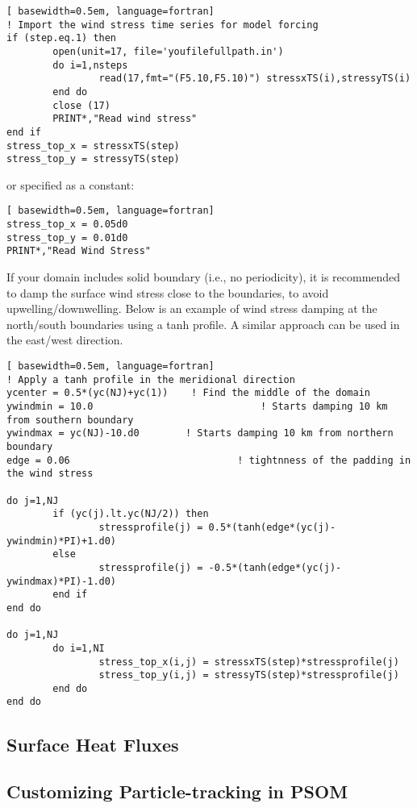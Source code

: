 \documentclass[12pt,letterpaper,titlepage]{article}
\begin{document}
\begin{lstlisting}[	basewidth=0.5em, language=fortran]
! Import the wind stress time series for model forcing
if (step.eq.1) then
		open(unit=17, file='youfilefullpath.in')
		do i=1,nsteps
				read(17,fmt="(F5.10,F5.10)") stressxTS(i),stressyTS(i)
		end do
		close (17)
		PRINT*,"Read wind stress"
end if
stress_top_x = stressxTS(step)
stress_top_y = stressyTS(step)
\end{lstlisting}	
or specified as a constant:

\begin{lstlisting}[	basewidth=0.5em, language=fortran]
stress_top_x = 0.05d0
stress_top_y = 0.01d0
PRINT*,"Read Wind Stress"
\end{lstlisting}	

If your domain includes solid boundary (i.e., no periodicity), it is recommended to damp the surface wind stress close to the boundaries, to avoid upwelling/downwelling. Below is an example of wind stress damping at the north/south boundaries using a tanh profile. A similar approach can be used in the east/west direction.

\begin{lstlisting}[	basewidth=0.5em, language=fortran]
! Apply a tanh profile in the meridional direction
ycenter = 0.5*(yc(NJ)+yc(1))	! Find the middle of the domain
ywindmin = 10.0 							! Starts damping 10 km from southern boundary
ywindmax = yc(NJ)-10.d0   	   ! Starts damping 10 km from northern boundary
edge = 0.06    							! tightnness of the padding in the wind stress

do j=1,NJ
		if (yc(j).lt.yc(NJ/2)) then
				stressprofile(j) = 0.5*(tanh(edge*(yc(j)-ywindmin)*PI)+1.d0)
		else
				stressprofile(j) = -0.5*(tanh(edge*(yc(j)-ywindmax)*PI)-1.d0)
		end if
end do

do j=1,NJ
		do i=1,NI
				stress_top_x(i,j) = stressxTS(step)*stressprofile(j)
				stress_top_y(i,j) = stressyTS(step)*stressprofile(j)
		end do
end do
\end{lstlisting}	

\subsection{Surface Heat Fluxes}



\subsection{Customizing Particle-tracking in PSOM}
\label{sec: myparticletracking}
\end{document}
